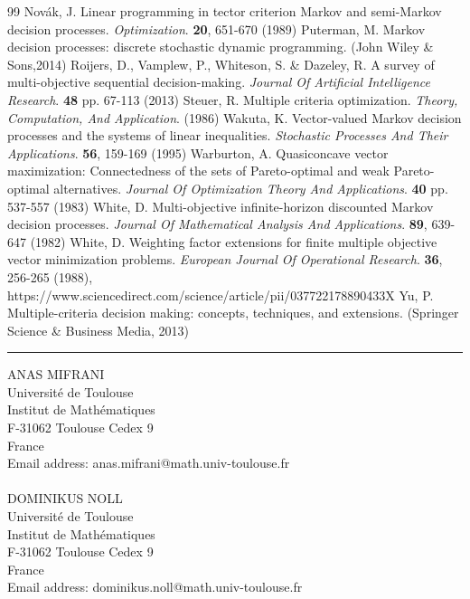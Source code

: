 \documentclass{article}
\theoremstyle{definition}
\numberwithin{equation}{section}
\begin{document}
\begin{thebibliography}{99}
Novák, J. Linear programming in tector criterion Markov and semi-Markov decision processes. {\em Optimization}. \textbf{20}, 651-670 (1989)
Puterman, M. Markov decision processes: discrete stochastic dynamic programming. (John Wiley \& Sons,2014)
Roijers, D., Vamplew, P., Whiteson, S. \& Dazeley, R. A survey of multi-objective sequential decision-making. {\em Journal Of Artificial Intelligence Research}. \textbf{48} pp. 67-113 (2013)
Steuer, R. Multiple criteria optimization. {\em Theory, Computation, And Application}. (1986)
Wakuta, K. Vector-valued Markov decision processes and the systems of linear inequalities. {\em Stochastic Processes And Their Applications}. \textbf{56}, 159-169 (1995)
Warburton, A. Quasiconcave vector maximization: Connectedness of the sets of Pareto-optimal and weak Pareto-optimal alternatives. {\em Journal Of Optimization Theory And Applications}. \textbf{40} pp. 537-557 (1983)
White, D. Multi-objective infinite-horizon discounted Markov decision processes. {\em Journal Of Mathematical Analysis And Applications}. \textbf{89}, 639-647 (1982)
White, D. Weighting factor extensions for finite multiple objective vector minimization problems. {\em European Journal Of Operational Research}. \textbf{36}, 256-265 (1988), https://www.sciencedirect.com/science/article/pii/037722178890433X
Yu, P. Multiple-criteria decision making: concepts, techniques, and extensions. (Springer Science \& Business Media, 2013)
\end{thebibliography}

\noindent\rule{\linewidth}{0.4pt}
\vspace*{2cm}

\noindent ANAS MIFRANI\\
Université de Toulouse\\
Institut de Mathématiques\\
F-31062 Toulouse Cedex 9\\
France\\
Email address: anas.mifrani@math.univ-toulouse.fr\\
\\
DOMINIKUS NOLL\\
Université de Toulouse\\
Institut de Mathématiques\\
F-31062 Toulouse Cedex 9\\
France\\
Email address: dominikus.noll@math.univ-toulouse.fr\\
\end{document}
